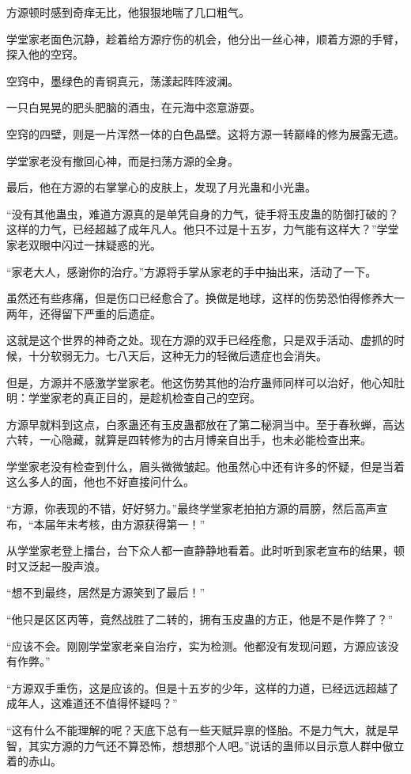 \begin{this_body}
方源顿时感到奇痒无比，他狠狠地喘了几口粗气。

学堂家老面色沉静，趁着给方源疗伤的机会，他分出一丝心神，顺着方源的手臂，探入他的空窍。

空窍中，墨绿色的青铜真元，荡漾起阵阵波澜。

一只白晃晃的肥头肥脑的酒虫，在元海中恣意游耍。

空窍的四壁，则是一片浑然一体的白色晶壁。这将方源一转巅峰的修为展露无遗。

学堂家老没有撤回心神，而是扫荡方源的全身。

最后，他在方源的右掌掌心的皮肤上，发现了月光蛊和小光蛊。

“没有其他蛊虫，难道方源真的是单凭自身的力气，徒手将玉皮蛊的防御打破的？这样的力气，已经超越了成年凡人。他只不过是十五岁，力气能有这样大？”学堂家老双眼中闪过一抹疑惑的光。

“家老大人，感谢你的治疗。”方源将手掌从家老的手中抽出来，活动了一下。

虽然还有些疼痛，但是伤口已经愈合了。换做是地球，这样的伤势恐怕得修养大一两年，还得留下严重的后遗症。

这就是这个世界的神奇之处。现在方源的双手已经痊愈，只是双手活动、虚抓的时候，十分软弱无力。七八天后，这种无力的轻微后遗症也会消失。

但是，方源并不感激学堂家老。他这伤势其他的治疗蛊师同样可以治好，他心知肚明：学堂家老的真正目的，是趁机检查自己的空窍。

方源早就料到这点，白豕蛊还有玉皮蛊都放在了第二秘洞当中。至于春秋蝉，高达六转，一心隐藏，就算是四转修为的古月博亲自出手，也未必能检查出来。

学堂家老没有检查到什么，眉头微微皱起。他虽然心中还有许多的怀疑，但是当着这么多人的面，他也不好直接问什么。

“方源，你表现的不错，好好努力。”最终学堂家老拍拍方源的肩膀，然后高声宣布，“本届年末考核，由方源获得第一！”

从学堂家老登上擂台，台下众人都一直静静地看着。此时听到家老宣布的结果，顿时又泛起一股声浪。

“想不到最终，居然是方源笑到了最后！”

“他只是区区丙等，竟然战胜了二转的，拥有玉皮蛊的方正，他是不是作弊了？”

“应该不会。刚刚学堂家老亲自治疗，实为检测。他都没有发现问题，方源应该没有作弊。”

“方源双手重伤，这是应该的。但是十五岁的少年，这样的力道，已经远远超越了成年人，这难道还不值得怀疑吗？”

“这有什么不能理解的呢？天底下总有一些天赋异禀的怪胎。不是力气大，就是早智，其实方源的力气还不算恐怖，想想那个人吧。”说话的蛊师以目示意人群中傲立着的赤山。


\end{this_body}
